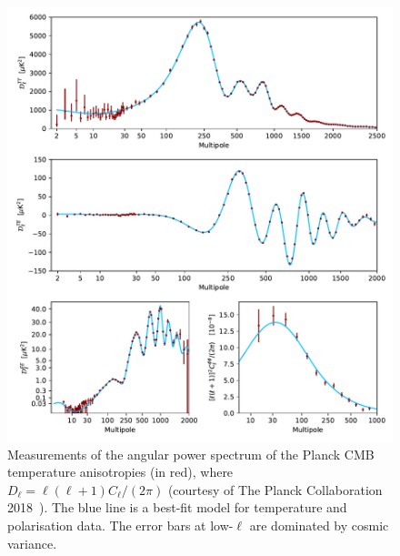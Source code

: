 \begin{figure}[htpb]
	\centering\capstart{}
	\includegraphics[trim={0 430 0 0},clip,width=\textwidth]{planck_2018_power_spectrum.pdf}
	\caption[
	The 2018 Planck CMB angular power spectrum in temperature
	]{
	Measurements of the angular power spectrum of the Planck CMB temperature anisotropies (in red), where \(D_{\ell} = \ell(\ell+1)C_{\ell}/(2\pi)\) (courtesy of The Planck Collaboration 2018~\cite{Planck2020}).
	The blue line is a best-fit model for temperature and polarisation data.
	The error bars at low-\(\ell{}\) are dominated by cosmic variance.
	}\label{fig:chapter2_power_spectrum}
\end{figure}
